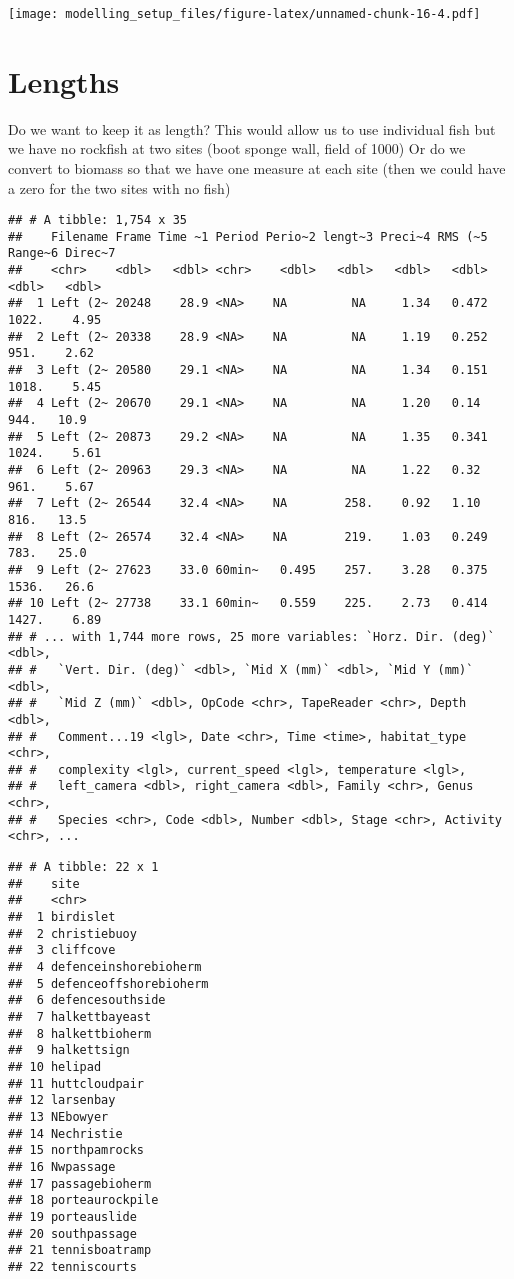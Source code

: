 \documentclass[
]{article}
\begin{document}
\texttt{[image: modelling\_setup\_files/figure-latex/unnamed-chunk-16-4.pdf]}

\hypertarget{lengths}{%
\section{Lengths}\label{lengths}}

Do we want to keep it as length? This would allow us to use individual
fish but we have no rockfish at two sites (boot sponge wall, field of
1000) Or do we convert to biomass so that we have one measure at each
site (then we could have a zero for the two sites with no fish)

\begin{verbatim}
## # A tibble: 1,754 x 35
##    Filename Frame Time ~1 Period Perio~2 lengt~3 Preci~4 RMS (~5 Range~6 Direc~7
##    <chr>    <dbl>   <dbl> <chr>    <dbl>   <dbl>   <dbl>   <dbl>   <dbl>   <dbl>
##  1 Left (2~ 20248    28.9 <NA>    NA         NA     1.34   0.472   1022.    4.95
##  2 Left (2~ 20338    28.9 <NA>    NA         NA     1.19   0.252    951.    2.62
##  3 Left (2~ 20580    29.1 <NA>    NA         NA     1.34   0.151   1018.    5.45
##  4 Left (2~ 20670    29.1 <NA>    NA         NA     1.20   0.14     944.   10.9 
##  5 Left (2~ 20873    29.2 <NA>    NA         NA     1.35   0.341   1024.    5.61
##  6 Left (2~ 20963    29.3 <NA>    NA         NA     1.22   0.32     961.    5.67
##  7 Left (2~ 26544    32.4 <NA>    NA        258.    0.92   1.10     816.   13.5 
##  8 Left (2~ 26574    32.4 <NA>    NA        219.    1.03   0.249    783.   25.0 
##  9 Left (2~ 27623    33.0 60min~   0.495    257.    3.28   0.375   1536.   26.6 
## 10 Left (2~ 27738    33.1 60min~   0.559    225.    2.73   0.414   1427.    6.89
## # ... with 1,744 more rows, 25 more variables: `Horz. Dir. (deg)` <dbl>,
## #   `Vert. Dir. (deg)` <dbl>, `Mid X (mm)` <dbl>, `Mid Y (mm)` <dbl>,
## #   `Mid Z (mm)` <dbl>, OpCode <chr>, TapeReader <chr>, Depth <dbl>,
## #   Comment...19 <lgl>, Date <chr>, Time <time>, habitat_type <chr>,
## #   complexity <lgl>, current_speed <lgl>, temperature <lgl>,
## #   left_camera <dbl>, right_camera <dbl>, Family <chr>, Genus <chr>,
## #   Species <chr>, Code <dbl>, Number <dbl>, Stage <chr>, Activity <chr>, ...
\end{verbatim}

\begin{verbatim}
## # A tibble: 22 x 1
##    site                  
##    <chr>                 
##  1 birdislet             
##  2 christiebuoy          
##  3 cliffcove             
##  4 defenceinshorebioherm 
##  5 defenceoffshorebioherm
##  6 defencesouthside      
##  7 halkettbayeast        
##  8 halkettbioherm        
##  9 halkettsign           
## 10 helipad               
## 11 huttcloudpair         
## 12 larsenbay             
## 13 NEbowyer              
## 14 Nechristie            
## 15 northpamrocks         
## 16 Nwpassage             
## 17 passagebioherm        
## 18 porteaurockpile       
## 19 porteauslide          
## 20 southpassage          
## 21 tennisboatramp        
## 22 tenniscourts
\end{verbatim}
\end{document}
